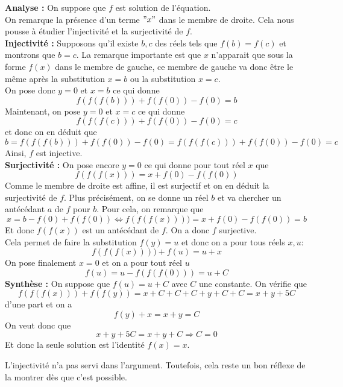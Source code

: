 \begin{sol}
\textbf{Analyse :} On suppose que $f$ est solution de l'équation.\\
On remarque la présence d'un terme $"x"$ dans le membre de droite. Cela nous pousse à étudier l'injectivité et la surjectivité de $f$.\\
\textbf{Injectivité :} Supposons qu'il existe $b,c$ des réels tels que $f(b)=f(c)$ et montrons que $b=c$. La remarque importante est que $x$ n'apparait que sous la forme $f(x)$ dans le membre de gauche, ce membre de gauche va donc être le même après la substitution $x=b$ ou la substitution $x=c$. \\
On pose donc $y=0$ et $x=b$ ce qui donne
$$f(f(f(b)))+f(f(0))-f(0)=b $$
Maintenant, on pose $y=0$ et $x=c$ ce qui donne
$$f(f(f(c)))+f(f(0))-f(0)=c$$
et donc on en déduit que
$$b=f(f(f(b)))+f(f(0))-f(0)=f(f(f(c)))+f(f(0))-f(0)=c $$
Ainsi, $f$ est injective.
\\
\textbf{Surjectivité :} On pose encore $y=0$ ce qui donne pour tout réel $x$ que
$$f(f(f(x)))=x+f(0)-f(f(0)) $$
Comme le membre de droite est affine, il est surjectif et on en déduit la surjectivité de $f$. Plus précisément, on se donne un réel $b$ et va chercher un antécédant $a$ de $f$ pour $b$. Pour cela, on remarque que
$$x=b-f(0)+f(f(0))\iff f(f(f(x))))=x+f(0)-f(f(0))=b $$
Et donc $f(f(x))$ est un antécédant de $f$. On a donc $f$ surjective.
\\
Cela permet de faire la substitution $f(y)=u$ et donc on a pour tous réels $x,u$:
$$f(f(f(x))))+f(u)=u+x $$
On pose finalement $x=0$ et on a pour tout réel $u$
$$f(u)=u-f(f(f(0)))=u+C $$
\textbf{Synthèse :} On suppose que $f(u)=u+C$ avec $C$ une constante. On vérifie que
$$f(f(f(x)))+f(f(y))=x+C+C+C+y+C+C=x+y+5C $$
d'une part et on a
$$f(y)+x=x+y=C $$
On veut donc que
$$x+y+5C=x+y+C\Rightarrow C=0 $$
Et donc la seule solution est l'identité $f(x)=x$.
\end{sol}
\begin{rem}
L'injectivité n'a pas servi dans l'argument. Toutefois, cela reste un bon réflexe de la montrer dès que c'est possible.
\end{rem}


